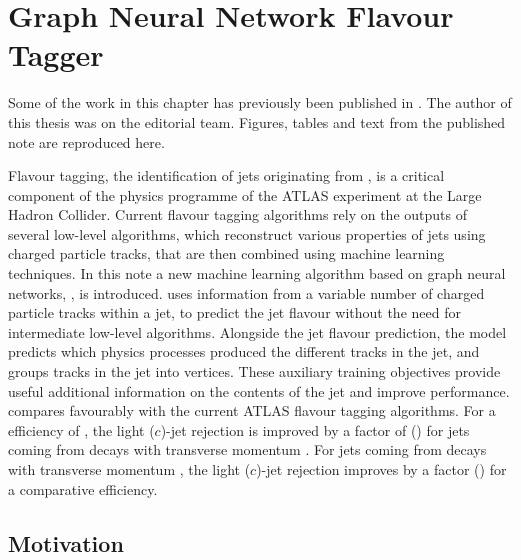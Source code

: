 \chapter{Graph Neural Network Flavour Tagger}\label{chap:gnn_tagger}

Some of the work in this chapter has previously been published in .
The author of this thesis was on the editorial team.
Figures, tables and text from the published note are reproduced here.

Flavour tagging, the identification of jets originating from \bcquarks, is a critical component of the physics programme of the ATLAS experiment at the Large Hadron Collider. 
Current flavour tagging algorithms rely on the outputs of several low-level algorithms, which reconstruct various properties of jets using charged particle tracks, that are then combined using machine learning techniques.
In this note a new machine learning algorithm based on graph neural networks, \GNN, is introduced.
\GNN uses information from a variable number of charged particle tracks within a jet, to predict the jet flavour without the need for intermediate low-level algorithms.
Alongside the jet flavour prediction, the model predicts which physics processes produced the different tracks in the jet, and groups tracks in the jet into vertices.
These auxiliary training objectives provide useful additional information on the contents of the jet and improve performance.
\GNN compares favourably with the current ATLAS flavour tagging algorithms.
For a \bjet efficiency of , the light ($c$)-jet rejection is improved by a factor of \ttbllo (\ttbclo) for jets coming from \ttbar decays with transverse momentum \ttbarpt.
For jets coming from \Zprime decays with transverse momentum \Zprimept, the light ($c$)-jet rejection improves by a factor \zpbllo (\zpbclo) for a comparative  \bjet efficiency.


\section{Motivation}\label{sec:gnn_motvation}


\newcommand{\fakesfootnote}{%
A fake track is defined as a track with a truth-matching probability less than $0.5$, where the truth-matching probability is defined in Ref.~\cite{PERF-2015-08}.
}

